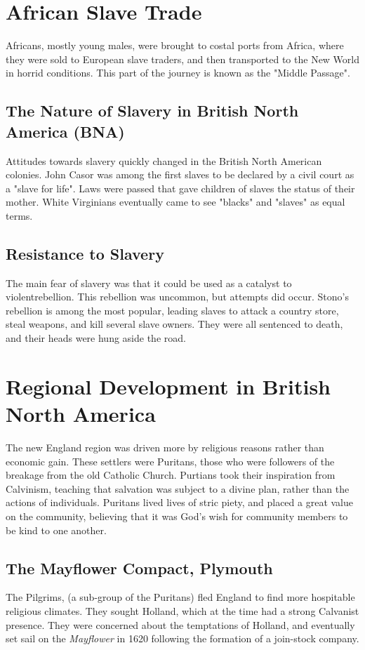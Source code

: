 \section{African Slave Trade}
Africans, mostly young males, were brought to costal ports from Africa, where
they were sold to European slave traders, and then transported to the New World
in horrid conditions.  This part of the journey is known as the "Middle
Passage".

\subsection{The Nature of Slavery in British North America (BNA)}
Attitudes towards slavery quickly changed in the British North American
colonies.  John Casor was among the first slaves to be declared by a civil court
as a "slave for life".  Laws were passed that gave children of slaves the status
of their mother.  White Virginians eventually came to see "blacks" and "slaves"
as equal terms.

\subsection{Resistance to Slavery}
The main fear of slavery was that it could be used as a catalyst to
violentrebellion.  This rebellion was uncommon, but attempts did occur.  Stono's
rebellion is among the most popular, leading slaves to  attack a country store,
steal weapons, and kill several slave owners.  They were all sentenced to death,
and their heads were hung aside the road.

\section{Regional Development in British North America}
The new England region was driven more by religious reasons rather than economic
gain.  These settlers were Puritans, those who were followers of the breakage
from the old Catholic Church.  Purtians took their inspiration from Calvinism,
teaching that salvation was subject to a divine plan, rather than the actions of
individuals.  Puritans lived lives of stric piety, and placed a great value on
the community, believing that it was God's wish for community members to be kind
to one another.

\subsection{The Mayflower Compact, Plymouth}
The Pilgrims, (a sub-group of the Puritans) fled England to find more hospitable
religious climates.  They sought Holland, which at the time had a strong
Calvanist presence.  They were concerned about the temptations of Holland, and
eventually set sail on the \textit{Mayflower} in 1620 following the formation of
a join-stock company.

